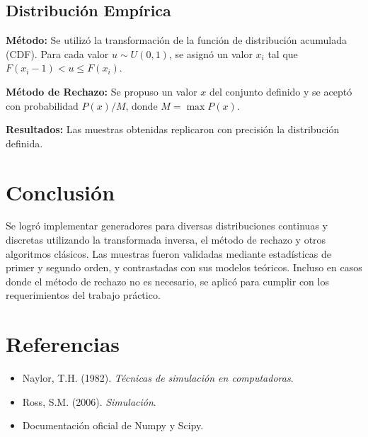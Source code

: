 \documentclass{article}
\begin{document}
\subsection{Distribución Empírica}
\textbf{Método:} Se utilizó la transformación de la función de distribución acumulada (CDF). Para cada valor $u \sim U(0,1)$, se asignó un valor $x_i$ tal que $F(x_i-1) < u \leq F(x_i)$.

\textbf{Método de Rechazo:} Se propuso un valor $x$ del conjunto definido y se aceptó con probabilidad $P(x)/M$, donde $M = \max P(x)$.

\textbf{Resultados:} Las muestras obtenidas replicaron con precisión la distribución definida.

\section{Conclusión}
Se logró implementar generadores para diversas distribuciones continuas y discretas utilizando la transformada inversa, el método de rechazo y otros algoritmos clásicos. Las muestras fueron validadas mediante estadísticas de primer y segundo orden, y contrastadas con sus modelos teóricos. Incluso en casos donde el método de rechazo no es necesario, se aplicó para cumplir con los requerimientos del trabajo práctico.

\section*{Referencias}
\begin{itemize}
\item Naylor, T.H. (1982). \textit{Técnicas de simulación en computadoras}.
\item Ross, S.M. (2006). \textit{Simulación}.
\item Documentación oficial de Numpy y Scipy.
\end{itemize}
\end{document}
